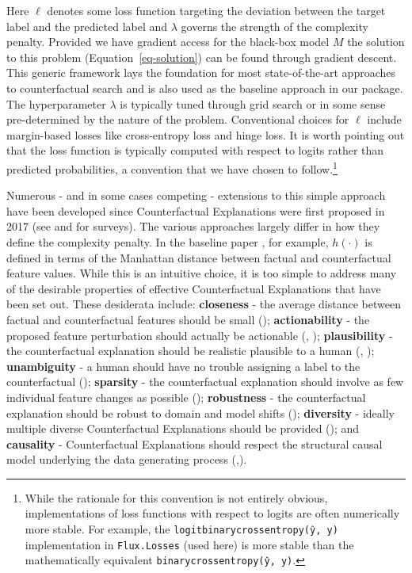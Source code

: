 \documentclass{juliacon}
\begin{document}
Here \(\ell\) denotes some loss function targeting the deviation between
the target label and the predicted label and \(\lambda\) governs the
strength of the complexity penalty. Provided we have gradient access for
the black-box model \(M\) the solution to this problem
(Equation~\ref{eq-solution}) can be found through gradient descent. This
generic framework lays the foundation for most state-of-the-art
approaches to counterfactual search and is also used as the baseline
approach in our package. The hyperparameter \(\lambda\) is typically
tuned through grid search or in some sense pre-determined by the nature
of the problem. Conventional choices for \(\ell\) include margin-based
losses like cross-entropy loss and hinge loss. It is worth pointing out
that the loss function is typically computed with respect to logits
rather than predicted probabilities, a convention that we have chosen to
follow.\footnote{While the rationale for this convention is not entirely
  obvious, implementations of loss functions with respect to logits are
  often numerically more stable. For example, the
  \texttt{logitbinarycrossentropy(ŷ,\ y)} implementation in
  \texttt{Flux.Losses} (used here) is more stable than the
  mathematically equivalent \texttt{binarycrossentropy(ŷ,\ y)}.}

Numerous - and in some cases competing - extensions to this simple
approach have been developed since Counterfactual Explanations were
first proposed in 2017 (see \cite{verma2020counterfactual} and
\cite{karimi2020survey} for surveys). The various approaches largely
differ in how they define the complexity penalty. In the baseline paper
\cite{wachter2017counterfactual}, for example, \(h(\cdot)\) is defined
in terms of the Manhattan distance between factual and counterfactual
feature values. While this is an intuitive choice, it is too simple to
address many of the desirable properties of effective Counterfactual
Explanations that have been set out. These desiderata include:
\textbf{closeness} - the average distance between factual and
counterfactual features should be small
(\cite{wachter2017counterfactual}); \textbf{actionability} - the
proposed feature perturbation should actually be actionable
(\cite{ustun2019actionable}, \cite{poyiadzi2020face});
\textbf{plausibility} - the counterfactual explanation should be
realistic plausible to a human (\cite{joshi2019realistic},
\cite{schut2021generating}); \textbf{unambiguity} - a human should have
no trouble assigning a label to the counterfactual
(\cite{schut2021generating}); \textbf{sparsity} - the counterfactual
explanation should involve as few individual feature changes as possible
(\cite{schut2021generating}); \textbf{robustness} - the counterfactual
explanation should be robust to domain and model shifts
(\cite{upadhyay2021robust}); \textbf{diversity} - ideally multiple
diverse Counterfactual Explanations should be provided
(\cite{mothilal2020explaining}); and \textbf{causality} - Counterfactual
Explanations should respect the structural causal model underlying the
data generating process
(\cite{karimi2020algorithmic},\cite{karimi2021algorithmic}).
\end{document}
